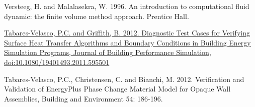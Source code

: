 Versteeg, H. and Malalasekra, W. 1996. An introduction to computational fluid dynamic: the finite volume method approach. Prentice Hall.

\href{../../../Documents\%20and\%20Settings/ptabares/My\%20Documents/Paulo/CV/Tabares\%20Velasco\%20CV\%20UPDATED2.doc}{Tabares-Velasco, P.C. and Griffith, B. 2012. Diagnostic Test Cases for Verifying Surface Heat Transfer Algorithms and Boundary Conditions in Building Energy Simulation Programs, Journal of Building Performance Simulation, doi:10.1080/19401493.2011.595501}

Tabares-Velasco, P.C., Christensen, C. and Bianchi, M. 2012. Verification and Validation of EnergyPlus Phase Change Material Model for Opaque Wall Assemblies, Building and Environment 54: 186-196.

